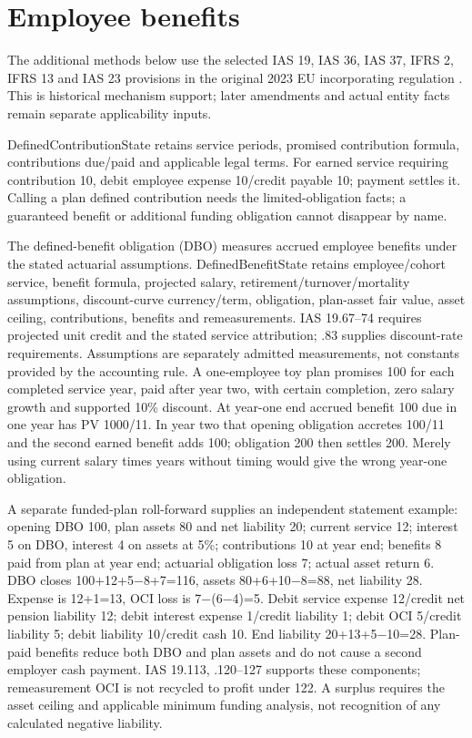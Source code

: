 \hypertarget{employee-benefits}{%
\section{Employee benefits}\label{method-corporate-extensions-employee-benefits}}

The additional methods below use the selected IAS 19, IAS 36, IAS 37, IFRS 2, IFRS 13 and IAS 23 provisions in the original 2023 EU incorporating regulation \citep{eu20231803}. This is historical mechanism support; later amendments and actual entity facts remain separate applicability inputs.

DefinedContributionState retains service periods, promised contribution formula, contributions due/paid and applicable legal terms. For earned service requiring contribution 10, debit employee expense 10/credit payable 10; payment settles it. Calling a plan defined contribution needs the limited-obligation facts; a guaranteed benefit or additional funding obligation cannot disappear by name.

The defined-benefit obligation (DBO) measures accrued employee benefits under the stated actuarial assumptions. DefinedBenefitState retains employee/cohort service, benefit formula, projected salary, retirement/turnover/mortality assumptions, discount-curve currency/term, obligation, plan-asset fair value, asset ceiling, contributions, benefits and remeasurements. IAS 19.67--74 requires projected unit credit and the stated service attribution; .83 supplies discount-rate requirements. Assumptions are separately admitted measurements, not constants provided by the accounting rule. A one-employee toy plan promises 100 for each completed service year, paid after year two, with certain completion, zero salary growth and supported 10\% discount. At year-one end accrued benefit 100 due in one year has PV 1000/11. In year two that opening obligation accretes 100/11 and the second earned benefit adds 100; obligation 200 then settles 200. Merely using current salary times years without timing would give the wrong year-one obligation.

A separate funded-plan roll-forward supplies an independent statement example: opening DBO 100, plan assets 80 and net liability 20; current service 12; interest 5 on DBO, interest 4 on assets at 5\%; contributions 10 at year end; benefits 8 paid from plan at year end; actuarial obligation loss 7; actual asset return 6. DBO closes 100+12+5\ensuremath{-}8+7=116, assets 80+6+10\ensuremath{-}8=88, net liability 28. Expense is 12+1=13, OCI loss is 7\ensuremath{-}(6\ensuremath{-}4)=5. Debit service expense 12/credit net pension liability 12; debit interest expense 1/credit liability 1; debit OCI 5/credit liability 5; debit liability 10/credit cash 10. End liability 20+13+5\ensuremath{-}10=28. Plan-paid benefits reduce both DBO and plan assets and do not cause a second employer cash payment. IAS 19.113, .120--127 supports these components; remeasurement OCI is not recycled to profit under 122. A surplus requires the asset ceiling and applicable minimum funding analysis, not recognition of any calculated negative liability.

